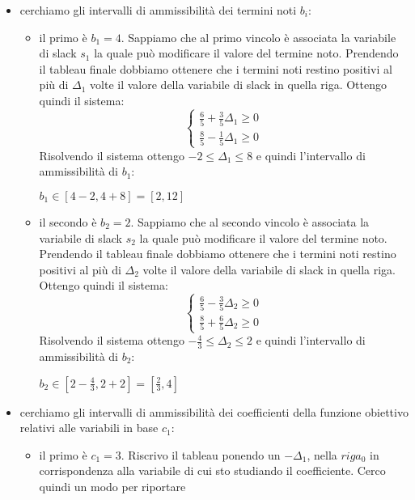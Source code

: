 \documentclass[a4paper,12pt, oneside]{book}
\begin{document}
\begin{itemize}
  \item cerchiamo gli intervalli di ammissibilità dei termini noti
  $b_i$:
  \begin{itemize}
    \item il primo è $b_1=4$. Sappiamo che al primo vincolo è
    associata la variabile di slack $s_1$ la quale può modificare il
    valore del termine noto. Prendendo il tableau finale dobbiamo
    ottenere che i termini noti restino positivi al più di $\Delta_1$
    volte il valore della variabile di slack in quella riga. Ottengo quindi
    il sistema:
    \[
      \begin{cases}
        \frac{6}{5}+\frac{3}{5}\Delta_1\geq 0\\
        \frac{8}{5}-\frac{1}{5}\Delta_1\geq 0
      \end{cases}
    \]
    Risolvendo il sistema ottengo $-2\leq \Delta_1\leq 8$ e quindi
    l'intervallo di ammissibilità di $b_1$:
    \begin{shaded}
      $b_1\in [4-2, 4+8]=[2,12]$
    \end{shaded}
    \item il secondo è $b_2=2$. Sappiamo che al secondo vincolo è
    associata la variabile di slack $s_2$  la quale può modificare il
    valore del termine noto. Prendendo il tableau finale dobbiamo
    ottenere che i termini noti restino positivi al più di $\Delta_2$
    volte il valore della variabile di slack in quella riga. Ottengo quindi
    il sistema:
    \[
      \begin{cases}
        \frac{6}{5}-\frac{3}{5}\Delta_2\geq 0\\
        \frac{8}{5}+\frac{6}{5}\Delta_2\geq 0
      \end{cases}
    \]
    Risolvendo il sistema ottengo $-\frac{4}{3}\leq \Delta_2\leq 2$ e quindi
    l'intervallo di ammissibilità di $b_2$:
    \begin{shaded}
      $b_2\in [2-\frac{4}{3}, 2+2]=[\frac{2}{3},4]$
    \end{shaded}
  \end{itemize}
  \item cerchiamo gli intervalli di ammissibilità dei coefficienti
  della funzione obiettivo relativi alle variabili in base $c_1$:
  \begin{itemize}
    \item il primo è $c_1=3$. Riscrivo il tableau ponendo un
    $-\Delta_1$, nella $riga_0$ in corrispondenza alla variabile di cui
    sto studiando il coefficiente. Cerco quindi un modo per riportare

\end{itemize}
\end{itemize}
\end{document}
